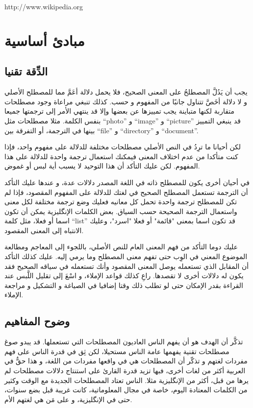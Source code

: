 http://www.wikipedia.org

\section[ref:34314226]{مبادئ أساسية}
\subsection{الدِّقة تقنيا}
يجب أن يَدُلَّ المصطلحُ على المعنى الصحيح، فلا يحمل دلالة أعَمَّ مما
للمصطلح الأصلي و لا دلالة أخَصَّ تتناول جانبًا من المفهوم و حسب. كذلك
تنبغي مراعاة وجود مصطلحات متقاربة لكنها متباينة يجب تمييزها عن بعضها
وإلا قد ينتهي الأمر إلى ترجمتها جميعا بنفس الكلمة. مثلا مصطلحات مثل
“photo” و “image” و “picture” قد ينبغي التمييز بينها في الترجمة، أو
التفرقة بين “file” و “directory” و “document”.

لكن أحيانا ما ترِدُ في النص الأصلي مصطلحات مختلفة للدلالة على مفهوم
واحد، فإذا كنت متأكدا من عدم اختلاف المعنى فيمكنك استعمال ترجمة واحدة
للدلالة على هذا المفهوم. لكن عليك التأكد أن هذا التوحيد لا يسبب أية لبس
أو غموض.

في أحيان أخرى يكون للمصطلح ذاته في اللغة المصدر دلالات عدة، و عندها عليك
التأكد أن الترجمة تستعمل المصطلح الصحيح في لغتك للدلالة على المفهوم
المقصود، فإذا لم تكن للمصطلح ترجمة واحدة تحمل كل معانيه فعليك وضع ترجمة
مختلفة لكل معنى واستعمال الترجمة الصحيحة حسب السياق. بعض الكلمات
الإنگليزية يمكن أن تكون اسما أو فعلا، مثل كلمة “list” قد تكون اسما
بمعنى "قائمة" أو فعلا "اسرد"، وعليك الانتباه إلى المعنى المقصود.

عليك دوما التأكد من فهم المعنى العام للنص الأصلي، باللجوء إلى المعاجم
ومطالعة الموضوع المعني في الوِب حتى تفهم معنى المصطلح وما يرمي إليه.
عليك كذلك التأكد أن المقابل الذي تستعمله يوصل المعنى المقصود وأنك
تستعمله في سياقه الصحيح فقد يكون له دلالات أخرى لا تقصدها. راعِ كذلك
قواعد الإملاء، و اسْعَ إلى تقليل اللَّبس عند القراءة بقدر الإمكان حتى
لو تطلب ذلك وقتا إضافيا في الصياغة و التشكيل و مراجعة الإملاء.

\subsection{وضوح المفاهيم}
تذكَّر أن الهدف هو أن يفهم الناس العاديون المصطلحات التي تستعملها. قد
يبدو صوغ مصطلحات تقنية يفهمها عامة الناس مستحيلا، لكن ثِق في قدرة الناس
على فهم مفردات لغتهم و تذكّر أن المصطلحات هي في واقعها مفردات من اللغة،
و هذا حقٌّ في العربية أكثر من لغات أخرى، فبها تزيد قدرة القارئ على
استنتاج دلالات مصطلحات لم يرها من قبل، أكثر من الإنگليزية مثلا. الناس
تعتاد المصطلحات الجديدة مع الوقت وكثير من الكلمات المعتادة اليوم، خاصة
في مجال المعلوماتية، كانت غريبة قبل بضع سنوات، حتى في الإنگليزية، و على
مَن هي لغتهم الأم.

